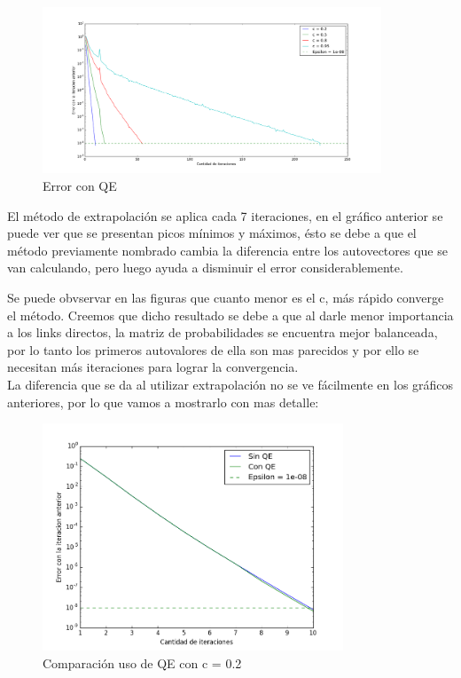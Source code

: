 \begin{figure}[H]
  \centering
    \includegraphics[width=0.9\textwidth]{errorConQE.png}
    \caption{Error con QE}
    \label{}
\end{figure}

El m\'etodo de extrapolaci\'on se aplica cada 7 iteraciones, en el gr\'afico anterior se puede ver que se presentan picos m\'inimos y m\'aximos, \'esto se debe a que el m\'etodo previamente nombrado cambia la diferencia entre los autovectores que se van calculando, pero luego ayuda a disminuir el error considerablemente.

Se puede obvservar en las figuras que cuanto menor es el c, m\'as r\'apido converge
el m\'etodo. Creemos que dicho resultado se debe a que al darle menor importancia
a los links directos, la matriz de probabilidades se encuentra mejor balanceada, 
por lo tanto los primeros autovalores de ella son mas parecidos y por ello se necesitan
m\'as iteraciones para lograr la convergencia.\\

La diferencia que se da al utilizar extrapolaci\'on no se ve f\'acilmente en los gr\'aficos anteriores, por lo que vamos a mostrarlo con mas detalle:

\begin{figure}[H]
  \centering
    \includegraphics[width=0.8\textwidth]{comparando2.png}
    \caption{Comparaci\'on uso de QE con c = 0.2}
    \label{}
\end{figure}


